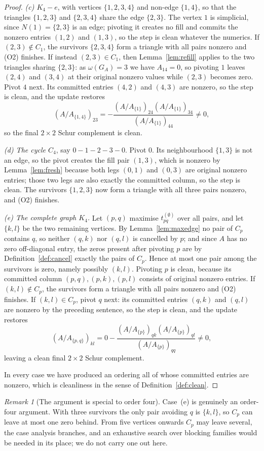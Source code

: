 \documentclass[11pt]{article}
\theoremstyle{plain}
\theoremstyle{definition}
\theoremstyle{remark}
\newtheorem{remark}[theorem]{Remark}
\begin{document}
\begin{humanblock}
\begin{proof}
\emph{(c) $K_4-e$}, with vertices $\{1,2,3,4\}$ and non-edge $\{1,4\}$, so that the triangles
$\{1,2,3\}$ and $\{2,3,4\}$ share the edge $\{2,3\}$. The vertex $1$ is simplicial, since
$N(1)=\{2,3\}$ is an edge; pivoting it creates no fill and commits the nonzero entries $(1,2)$ and
$(1,3)$, so the step is clean whatever the numerics. If $(2,3)\notin C_1$, the survivors $\{2,3,4\}$
form a triangle with all pairs nonzero and (O2) finishes. If instead $(2,3)\in C_1$, then
Lemma~\ref{lem:refill} applies to the two triangles sharing $\{2,3\}$: as $\omega(G_A)=3$ we have
$A_{14}=0$, so pivoting $1$ leaves $(2,4)$ and $(3,4)$ at their original nonzero values while $(2,3)$
becomes zero. Pivot $4$ next. Its committed entries $(4,2)$ and $(4,3)$ are nonzero, so the step is
clean, and the update restores
\[
  (A/A_{\{1,4\}})_{23}=-\frac{(A/A_{\{1\}})_{24}(A/A_{\{1\}})_{34}}{(A/A_{\{1\}})_{44}}\neq0,
\]
so the final $2\times2$ Schur complement is clean.

\emph{(d) The cycle $C_4$}, say $0-1-2-3-0$. Pivot $0$. Its neighbourhood $\{1,3\}$ is not an edge, so
the pivot creates the fill pair $(1,3)$, which is nonzero by Lemma~\ref{lem:fresh} because both legs
$(0,1)$ and $(0,3)$ are original nonzero entries; those two legs are also exactly the committed
column, so the step is clean. The survivors $\{1,2,3\}$ now form a triangle with all three pairs
nonzero, and (O2) finishes.

\emph{(e) The complete graph $K_4$.} Let $(p,q)$ maximise $t^{(\emptyset)}_{pq}$ over all pairs, and
let $\{k,l\}$ be the two remaining vertices. By Lemma~\ref{lem:maxedge} no pair of $C_p$ contains
$q$, so neither $(q,k)$ nor $(q,l)$ is cancelled by $p$; and since $A$ has no zero off-diagonal
entry, the zeros present after pivoting $p$ are by Definition~\ref{def:cancel} exactly the pairs of
$C_p$. Hence at most one pair among the survivors is zero, namely possibly $(k,l)$. Pivoting $p$ is
clean, because its committed column $(p,q),(p,k),(p,l)$ consists of original nonzero entries. If
$(k,l)\notin C_p$, the survivors form a triangle with all pairs nonzero and (O2) finishes. If
$(k,l)\in C_p$, pivot $q$ next: its committed entries $(q,k)$ and $(q,l)$ are nonzero by the
preceding sentence, so the step is clean, and the update restores
\[
  (A/A_{\{p,q\}})_{kl}=0-\frac{(A/A_{\{p\}})_{qk}(A/A_{\{p\}})_{ql}}{(A/A_{\{p\}})_{qq}}\neq0,
\]
leaving a clean final $2\times2$ Schur complement.

In every case we have produced an ordering all of whose committed entries are nonzero, which is
cleanliness in the sense of Definition~\ref{def:clean}.
\end{proof}

\begin{remark}[The argument is special to order four]\label{rem:leq4-sharp}
Case~(e) is genuinely an order-four argument. With three survivors the only pair avoiding $q$ is
$\{k,l\}$, so $C_p$ can leave at most one zero behind. From five vertices onwards $C_p$ may leave
several, the case analysis branches, and an exhaustive search over blocking families would be needed
in its place; we do not carry one out here.
\end{remark}
\end{humanblock}
\end{document}
